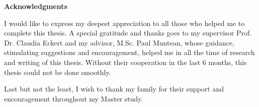 \clearemptydoublepage
{}
{}	



\vspace*{2cm}

\begin{center}
{\Large \bf Acknowledgments}
\end{center}

\vspace{1cm}




I would like to express my deepest appreciation to all those who helped me to complete this thesis. A special gratitude and thanks goes to my supervisor Prof. Dr. Claudia Eckert and my advisor, M.Sc. Paul Muntean, whose guidance, stimulating suggestions and encouragement, helped me in all the time of research and writing of this thesis. Without their cooperation in the last 6 months, this thesis could not be done smoothly.

Last but not the least, I wish to thank my family for their support and encouragement throughout my Master study.